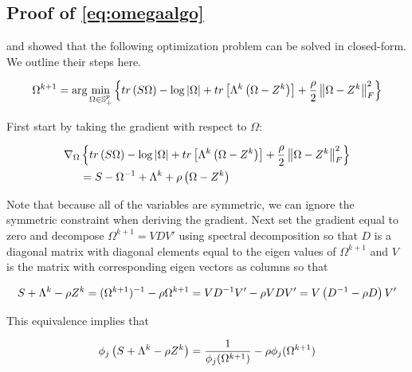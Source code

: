 \documentclass[11pt,]{report}
\theoremstyle{definition}
\theoremstyle{definition}
\theoremstyle{definition}
\theoremstyle{remark}
\begin{document}
\hypertarget{proofomegaalgo}{%
\subsection{Proof of \eqref{eq:omegaalgo}}\label{proofomegaalgo}}

\citet{witten2009covariance} and \citet{price2015ridge} showed that the following optimization problem can be solved in closed-form. We outline their steps here.

\begin{equation}
\Omega^{k + 1} = \arg\min_{\Omega \in \mathbb{S}_{+}^{p}}\left\{ tr\left(S\Omega\right) - \log\left|\Omega\right| + tr\left[\Lambda^{k}\left(\Omega - Z^{k}\right)\right] + \frac{\rho}{2}\left\| \Omega - Z^{k} \right\|_{F}^{2} \right\}
\label{eq:appendixomegaloglik}\notag
\end{equation}

First start by taking the gradient with respect to \(\Omega\):

\begin{equation}
\begin{split}
  \nabla_{\Omega}&\left\{ tr\left(S\Omega\right) - \log\left|\Omega\right| + tr\left[\Lambda^{k}\left(\Omega - Z^{k}\right)\right] + \frac{\rho}{2}\left\| \Omega - Z^{k} \right\|_{F}^{2} \right\} \\
  &= S - \Omega^{-1} + \Lambda^{k} + \rho\left( \Omega - Z^{k} \right)
\end{split}
\label{eq:appendixomegagradient}\notag
\end{equation}

Note that because all of the variables are symmetric, we can ignore the symmetric constraint when deriving the gradient. Next set the gradient equal to zero and decompose \(\Omega^{k + 1} = VDV'\) using spectral decomposition so that \(D\) is a diagonal matrix with diagonal elements equal to the eigen values of \(\Omega^{k + 1}\) and \(V\) is the matrix with corresponding eigen vectors as columns so that

\begin{equation}
S + \Lambda^{k} - \rho Z^{k} = (\Omega^{k + 1})^{-1} - \rho \Omega^{k + 1} = VD^{-1}V' - \rho VDV' =  V\left(D^{-1} - \rho D\right)V'\notag
\end{equation}

This equivalence implies that

\begin{equation}
\phi_{j}\left( S + \Lambda^{k} - \rho Z^{k} \right) = \frac{1}{\phi_{j}(\Omega^{k + 1})} - \rho\phi_{j}(\Omega^{k + 1})\notag
\end{equation}
\end{document}
